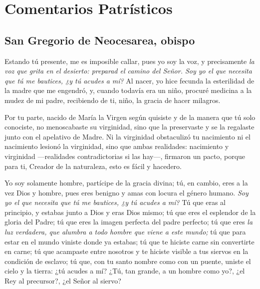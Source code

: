 \newsection

	\section{Comentarios Patrísticos}
	
		\subsection{San Gregorio de Neocesarea, obispo}
		
			
			
			\begin{body}
				Estando tú presente, me es imposible callar, pues yo soy la voz, y precisamente \emph{la voz que grita en el desierto: preparad el camino del Señor. Soy yo el que necesita que tú me bautices, ¿y tú acudes a mí?} Al nacer, yo hice fecunda la esterilidad de la madre que me engendró, y, cuando todavía era un niño, procuré medicina a la mudez de mi padre, recibiendo de ti, niño, la gracia de hacer milagros.
				
				Por tu parte, nacido de María la Virgen según quisiste y de la manera que tú solo conociste, no menoscabaste su virginidad, sino que la preservaste y se la regalaste junto con el apelativo de Madre. Ni la virginidad obstaculizó tu nacimiento ni el nacimiento lesionó la virginidad, sino que ambas realidades: nacimiento y virginidad ---realidades contradictorias si las hay---, firmaron un pacto, porque para ti, Creador de la naturaleza, esto es fácil y hacedero.
				
				Yo soy solamente hombre, partícipe de la gracia divina; tú, en cambio, eres a la vez Dios y hombre, pues eres benigno y amas con locura el género humano. \emph{Soy yo el que necesita que tú me bautices, ¿y tú acudes a mí?} Tú que eras al principio, y estabas junto a Dios y eras Dios mismo; tú que eres el esplendor de la gloria del Padre; tú que eres la imagen perfecta del padre perfecto; tú que eres \emph{la luz verdadera, que alumbra a todo hombre que viene a este mundo;} tú que para estar en el mundo viniste donde ya estabas; tú que te hiciste carne sin convertirte en carne; tú que acampaste entre nosotros y te hiciste visible a tus siervos en la condición de esclavo; tú que, con tu santo nombre como con un puente, uniste el cielo y la tierra: ¿tú acudes a mí? ¿Tú, tan grande, a un hombre como yo?, ¿el Rey al precursor?, ¿el Señor al siervo?
				

\end{body}
